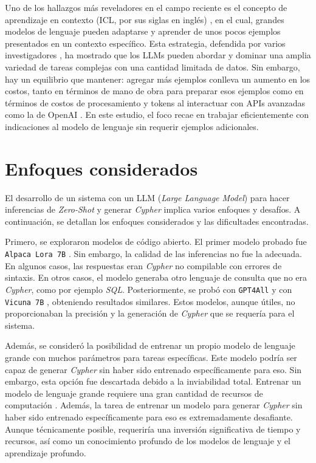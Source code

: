 Uno de los hallazgos más reveladores en el campo reciente es el concepto de aprendizaje en contexto (ICL, por sus siglas en inglés) \cite{llmsoverview}, en el cual, grandes modelos de lenguaje pueden adaptarse y aprender de unos pocos ejemplos presentados en un contexto específico. Esta estrategia, defendida por varios investigadores \cite{sunetal2023} \cite{pourrezandrafiei2023}, ha mostrado que los LLMs pueden abordar y dominar una amplia variedad de tareas complejas con una cantidad limitada de datos. Sin embargo, hay un equilibrio que mantener: agregar más ejemplos conlleva un aumento en los costos, tanto en términos de mano de obra para preparar esos ejemplos como en términos de costos de procesamiento y tokens al interactuar con APIs avanzadas como la de OpenAI \cite{openaiapikey}. En este estudio, el foco recae en trabajar eficientemente con indicaciones al modelo de lenguaje sin requerir ejemplos adicionales.

\section{Enfoques considerados} \label{considered_approaches}

El desarrollo de un sistema con un LLM (\textit{Large Language Model}) para hacer inferencias de \textit{Zero-Shot} y generar \textit{Cypher} implica varios enfoques y desafíos. A continuación, se detallan los enfoques considerados y las dificultades encontradas.

Primero, se exploraron modelos de código abierto. El primer modelo probado fue \texttt{Alpaca Lora 7B} \cite{alpacalora}. Sin embargo, la calidad de las inferencias no fue la adecuada. En algunos casos, las respuestas eran \textit{Cypher} no compilable con errores de sintaxis. En otros casos, el modelo generaba otro lenguaje de consulta que no era \textit{Cypher}, como por ejemplo \textit{SQL}. Posteriormente, se probó con \texttt{GPT4All} \cite{gpt4all} y con \texttt{Vicuna 7B} \cite{vicuna7b}, obteniendo resultados similares. Estos modelos, aunque útiles, no proporcionaban la precisión y la generación de \textit{Cypher} que se requería para el sistema.

Además, se consideró la posibilidad de entrenar un propio modelo de lenguaje grande con muchos parámetros para tareas específicas. Este modelo podría ser capaz de generar \textit{Cypher} sin haber sido entrenado específicamente para eso. Sin embargo, esta opción fue descartada debido a la inviabilidad total. Entrenar un modelo de lenguaje grande requiere una gran cantidad de recursos de computación \cite{llmsoverview}. Además, la tarea de entrenar un modelo para generar \textit{Cypher} sin haber sido entrenado específicamente para eso es extremadamente desafiante. Aunque técnicamente posible, requeriría una inversión significativa de tiempo y recursos, así como un conocimiento profundo de los modelos de lenguaje y el aprendizaje profundo.

